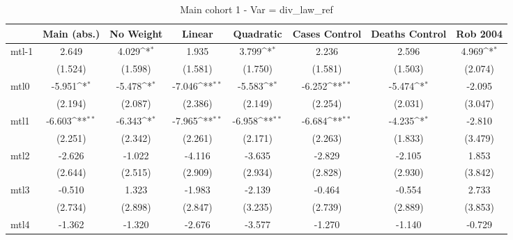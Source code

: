 \documentclass{article}
\begin{document}
{
\def\sym#1{\ifmmode^{#1}\else\(^{#1}\)\fi}
\begin{longtable}{l*{7}{c}}
\caption{Main cohort 1 - Var = div\_law\_ref}\\
\hline\hline\endfirsthead\hline\endhead\hline\endfoot\endlastfoot
                &\multicolumn{1}{c}{Main (abs.)}&\multicolumn{1}{c}{No Weight}&\multicolumn{1}{c}{Linear}&\multicolumn{1}{c}{Quadratic}&\multicolumn{1}{c}{Cases Control}&\multicolumn{1}{c}{Deaths Control}&\multicolumn{1}{c}{Rob 2004}\\
\hline
mtl-1           &    2.649         &    4.029\sym{*}  &    1.935         &    3.799\sym{*}  &    2.236         &    2.596         &    4.969\sym{*}  \\
                &  (1.524)         &  (1.598)         &  (1.581)         &  (1.750)         &  (1.581)         &  (1.503)         &  (2.074)         \\
mtl0            &   -5.951\sym{*}  &   -5.478\sym{*}  &   -7.046\sym{**} &   -5.583\sym{*}  &   -6.252\sym{**} &   -5.474\sym{*}  &   -2.095         \\
                &  (2.194)         &  (2.087)         &  (2.386)         &  (2.149)         &  (2.254)         &  (2.031)         &  (3.047)         \\
mtl1            &   -6.603\sym{**} &   -6.343\sym{*}  &   -7.965\sym{**} &   -6.958\sym{**} &   -6.684\sym{**} &   -4.235\sym{*}  &   -2.810         \\
                &  (2.251)         &  (2.342)         &  (2.261)         &  (2.171)         &  (2.263)         &  (1.833)         &  (3.479)         \\
mtl2            &   -2.626         &   -1.022         &   -4.116         &   -3.635         &   -2.829         &   -2.105         &    1.853         \\
                &  (2.644)         &  (2.515)         &  (2.909)         &  (2.934)         &  (2.828)         &  (2.930)         &  (3.842)         \\
mtl3            &   -0.510         &    1.323         &   -1.983         &   -2.139         &   -0.464         &   -0.554         &    2.733         \\
                &  (2.734)         &  (2.898)         &  (2.847)         &  (3.235)         &  (2.739)         &  (2.889)         &  (3.853)         \\
mtl4            &   -1.362         &   -1.320         &   -2.676         &   -3.577         &   -1.270         &   -1.140         &   -0.729         \\

\end{longtable}}
\end{document}
